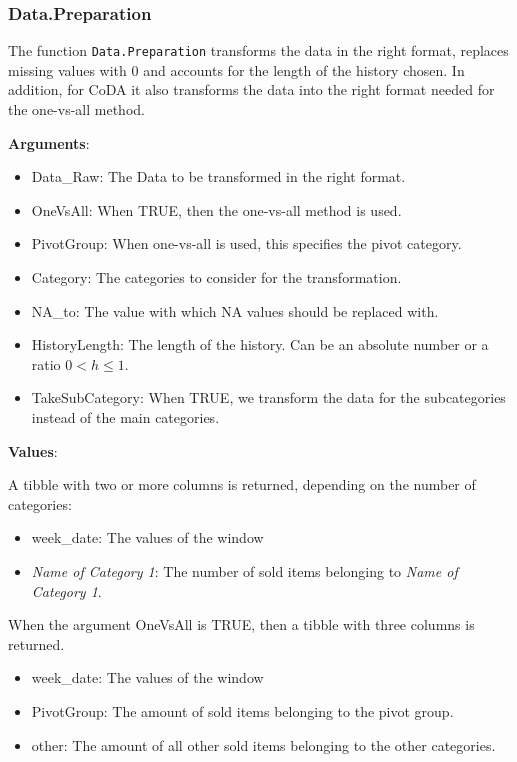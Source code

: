 \subsubsection{Data.Preparation}
\label{sec:Data.Preparation}

The function \texttt{Data.Preparation} transforms the data in the right format, replaces missing values with 0 and accounts for the length of the history chosen. In addition, for CoDA it also transforms the data into the right format needed for the one-vs-all method.

\textbf{Arguments}:

\begin{itemize}
	\item Data\_Raw: The Data to be transformed in the right format.
  \item OneVsAll: When TRUE, then the one-vs-all method is used.
  \item PivotGroup: When one-vs-all is used, this specifies the pivot category.
  \item Category: The categories to consider for the transformation.
  \item NA\_to: The value with which NA values should be replaced with.
  \item HistoryLength: The length of the history. Can be an absolute number or a ratio $0<h\leq 1$. 
  \item TakeSubCategory: When TRUE, we transform the data for the subcategories instead of the main categories. 
\end{itemize}

\textbf{Values}:

A tibble with two or more columns is returned, depending on the number of categories: 

\begin{itemize}
	\item week\_date: The values of the window
	\item \textit{Name of Category 1}: The number of sold items belonging to \textit{Name of Category 1}.
\end{itemize}

When the argument OneVsAll is TRUE, then a tibble with three columns is returned.


\begin{itemize}
	\item week\_date: The values of the window
	\item PivotGroup: The amount of sold items belonging to the pivot group.
	\item other: The amount of all other sold items belonging to the other categories. 
\end{itemize}

